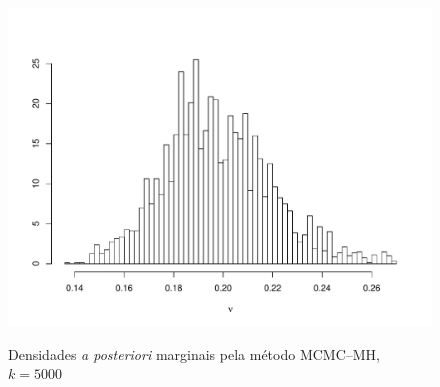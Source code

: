 \documentclass[9pt]{beamer}
\begin{document}
\begin{frame}
\begin{figure}[t]
{{\includegraphics[scale=0.2]{figuras/nu_mh_5000.pdf}}}%
\caption{Densidades \textit{a posteriori} marginais pela método MCMC--MH, $k = 5000$}%
\end{figure}
\end{frame}
\end{document}
